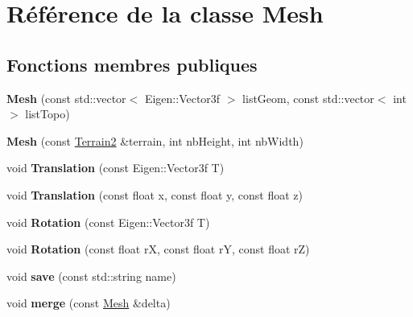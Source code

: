 \hypertarget{class_mesh}{}\section{Référence de la classe Mesh}
\label{class_mesh}
\subsection*{Fonctions membres publiques}
\begin{DoxyCompactItemize}
\item 
\hypertarget{class_mesh_a7ed6cd1a888646d805303d537416da0e}{}{\bfseries Mesh} (const std\+::vector$<$ Eigen\+::\+Vector3f $>$ list\+Geom, const std\+::vector$<$ int $>$ list\+Topo)\label{class_mesh_a7ed6cd1a888646d805303d537416da0e}

\item 
\hypertarget{class_mesh_a65b90eff4945120e88c1198ab2787e1d}{}{\bfseries Mesh} (const \hyperlink{class_terrain2}{Terrain2} \&terrain, int nb\+Height, int nb\+Width)\label{class_mesh_a65b90eff4945120e88c1198ab2787e1d}

\item 
\hypertarget{class_mesh_abd4c622a1db5d219778e69e6eb9edd31}{}void {\bfseries Translation} (const Eigen\+::\+Vector3f T)\label{class_mesh_abd4c622a1db5d219778e69e6eb9edd31}

\item 
\hypertarget{class_mesh_abdb59782fb5bd09ae504796f2a62032a}{}void {\bfseries Translation} (const float x, const float y, const float z)\label{class_mesh_abdb59782fb5bd09ae504796f2a62032a}

\item 
\hypertarget{class_mesh_a755af0bedd07e7d36e9ad6321ca037b5}{}void {\bfseries Rotation} (const Eigen\+::\+Vector3f T)\label{class_mesh_a755af0bedd07e7d36e9ad6321ca037b5}

\item 
\hypertarget{class_mesh_ab9233fd2b1023b6c6f28dfe6810214ae}{}void {\bfseries Rotation} (const float r\+X, const float r\+Y, const float r\+Z)\label{class_mesh_ab9233fd2b1023b6c6f28dfe6810214ae}

\item 
\hypertarget{class_mesh_a6cdf793d9395cb3a0c339d72021d6aff}{}void {\bfseries save} (const std\+::string name)\label{class_mesh_a6cdf793d9395cb3a0c339d72021d6aff}

\item 
\hypertarget{class_mesh_a8ba5369aea36e244ec1e64421ea6c72e}{}void {\bfseries merge} (const \hyperlink{class_mesh}{Mesh} \&delta)\label{class_mesh_a8ba5369aea36e244ec1e64421ea6c72e}


\end{DoxyCompactItemize}
